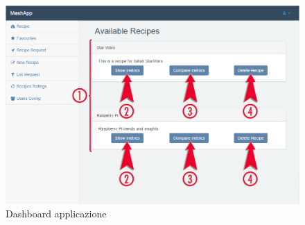 			\begin{figure}[H]
				\centering
				\centerline{\includegraphics[width=19cm]{images/dashboard_amministratore.png}}
				\caption{Dashboard applicazione}
				\label{fig:dashboard}
			\end{figure}



